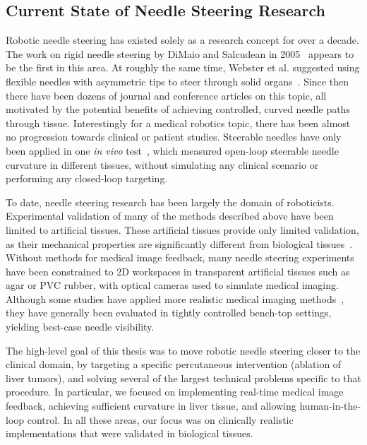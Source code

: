 \subsection{Current State of Needle Steering Research}
Robotic needle steering has existed solely as a research concept for over a decade. The work on rigid needle steering by DiMaio and Salcudean in 2005~\cite{DiMaio2005} appears to be the first in this area. At roughly the same time, Webster et al. suggested using flexible needles with asymmetric tips to steer through solid organs~\cite{Webster2005}. Since then there have been dozens of journal and conference articles on this topic, all motivated by the potential benefits of achieving controlled, curved needle paths through tissue. Interestingly for a medical robotics topic, there has been almost no progression towards clinical or patient studies. Steerable needles have only been applied in one \textit{in vivo} test~\cite{Majewicz2012}, which measured open-loop steerable needle curvature in different tissues, without simulating any clinical scenario or performing any closed-loop targeting.

To date, needle steering research has been largely the domain of roboticists. Experimental validation of many of the methods described above have been limited to artificial tissues. These artificial tissues provide only limited validation, as their mechanical properties are significantly different from biological tissues~\cite{Wedlick2012}. Without methods for medical image feedback, many needle steering experiments have been constrained to 2D workspaces in transparent artificial tissues such as agar or PVC rubber, with optical cameras used to simulate medical imaging. Although some studies have applied more realistic medical imaging methods~\cite{Glozman2007,Neubach2010,Abayazid2014}, they have generally been evaluated in tightly controlled bench-top settings, yielding best-case needle visibility.

The high-level goal of this thesis was to move robotic needle steering closer to the clinical domain, by targeting a specific percutaneous intervention (ablation of liver tumors), and solving several of the largest technical problems specific to that procedure. In particular, we focused on implementing real-time medical image feedback, achieving sufficient curvature in liver tissue, and allowing human-in-the-loop control. In all these areas, our focus was on clinically realistic implementations that were validated in biological tissues.  

